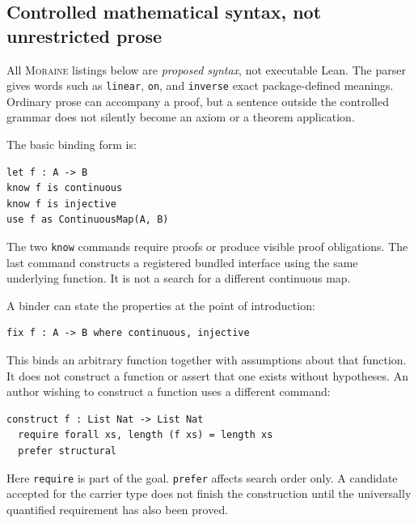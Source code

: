 \documentclass[11pt,letterpaper]{article}
\newcommand{\code}[1]{\nolinkurl{#1}}
\newcommand{\moraine}{\textsc{Moraine}}
\theoremstyle{definition}
\theoremstyle{remark}
\begin{document}
\subsection{Controlled mathematical syntax, not unrestricted prose}
All \moraine{} listings below are \emph{proposed syntax}, not executable Lean. The
parser gives words such as \code{linear}, \code{on}, and \code{inverse} exact
package-defined meanings. Ordinary prose can accompany a proof, but a sentence
outside the controlled grammar does not silently become an axiom or a theorem
application.

The basic binding form is:
\begin{lstlisting}
let f : A -> B
know f is continuous
know f is injective
use f as ContinuousMap(A, B)
\end{lstlisting}
The two \code{know} commands require proofs or produce visible proof obligations.
The last command constructs a registered bundled interface using the same
underlying function. It is not a search for a different continuous map.

A binder can state the properties at the point of introduction:
\begin{lstlisting}
fix f : A -> B where continuous, injective
\end{lstlisting}
This binds an arbitrary function together with assumptions about that function.
It does not construct a function or assert that one exists without hypotheses.
An author wishing to construct a function uses a different command:
\begin{lstlisting}
construct f : List Nat -> List Nat
  require forall xs, length (f xs) = length xs
  prefer structural
\end{lstlisting}
Here \code{require} is part of the goal. \code{prefer} affects search order only.
A candidate accepted for the carrier type does not finish the construction until
the universally quantified requirement has also been proved.
\end{document}
